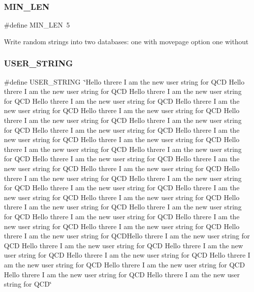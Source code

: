 \mbox{\label{adat-devel_2other__libs_2filedb_2filehash_2tdualwrite_8c_aa69f8dba9add1a52ce3cf7bcfafcfda0}} 
\subsubsection{\texorpdfstring{MIN\_LEN}{MIN\_LEN}}
{\footnotesize\ttfamily \#define M\+I\+N\+\_\+\+L\+EN~5}

Write random strings into two databases\+: one with movepage option one without \mbox{\label{adat-devel_2other__libs_2filedb_2filehash_2tdualwrite_8c_a5fdc86a0c07ccece3ef65e2f46c0ffd4}} 
\subsubsection{\texorpdfstring{USER\_STRING}{USER\_STRING}}
{\footnotesize\ttfamily \#define U\+S\+E\+R\+\_\+\+S\+T\+R\+I\+NG~\char`\"{}Hello threre I am the new user string for Q\+CD Hello threre I am the new user string for Q\+CD Hello threre I am the new user string for Q\+CD Hello threre I am the new user string for Q\+CD Hello threre I am the new user string for Q\+CD Hello threre I am the new user string for Q\+CD Hello threre I am the new user string for Q\+CD Hello threre I am the new user string for Q\+CD Hello threre I am the new user string for Q\+CD Hello threre I am the new user string for Q\+CD Hello threre I am the new user string for Q\+CD Hello threre I am the new user string for Q\+CD Hello threre I am the new user string for Q\+CD Hello threre I am the new user string for Q\+CD Hello threre I am the new user string for Q\+CD Hello threre I am the new user string for Q\+CD Hello threre I am the new user string for Q\+CD Hello threre I am the new user string for Q\+CD Hello threre I am the new user string for Q\+CD Hello threre I am the new user string for Q\+CD Hello threre I am the new user string for Q\+CD Hello threre I am the new user string for Q\+CD Hello threre I am the new user string for Q\+CD Hello threre I am the new user string for Q\+CD Hello threre I am the new user string for Q\+CD Hello threre I am the new user string for Q\+CD Hello threre I am the new user string for Q\+C\+D\+Hello threre I am the new user string for Q\+CD  Hello threre I am the new user string for Q\+CD Hello threre I am the new user string for Q\+CD Hello threre I am the new user string for Q\+CD Hello threre I am the new user string for Q\+CD Hello threre I am the new user string for Q\+CD Hello threre I am the new user string for Q\+CD Hello threre I am the new user string for Q\+CD\char`\"{}}



